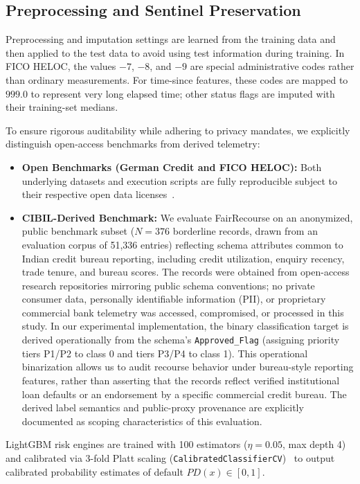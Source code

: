 \documentclass[manuscript,screen,review,anonymous]{acmart}
\begin{document}
\subsection{Preprocessing and Sentinel Preservation}
Preprocessing and imputation settings are learned from the training data and then applied to the test data to avoid using test information during training. In FICO HELOC, the values $-7$, $-8$, and $-9$ are special administrative codes rather than ordinary measurements. For time-since features, these codes are mapped to $999.0$ to represent very long elapsed time; other status flags are imputed with their training-set medians.

To ensure rigorous auditability while adhering to privacy mandates, we explicitly distinguish open-access benchmarks from derived telemetry:
\begin{itemize}
    \item \textbf{Open Benchmarks (German Credit and FICO HELOC):} Both underlying datasets and execution scripts are fully reproducible subject to their respective open data licenses~\cite{uci1994statlog,fico2018challenge}.
    \item \textbf{CIBIL-Derived Benchmark:} We evaluate FairRecourse on an anonymized, public benchmark subset ($N=376$ borderline records, drawn from an evaluation corpus of 51,336 entries) reflecting schema attributes common to Indian credit bureau reporting, including credit utilization, enquiry recency, trade tenure, and bureau scores. The records were obtained from open-access research repositories mirroring public schema conventions; no private consumer data, personally identifiable information (PII), or proprietary commercial bank telemetry was accessed, compromised, or processed in this study. In our experimental implementation, the binary classification target is derived operationally from the schema's \texttt{Approved\_Flag} (assigning priority tiers P1/P2 to class 0 and tiers P3/P4 to class 1). This operational binarization allows us to audit recourse behavior under bureau-style reporting features, rather than asserting that the records reflect verified institutional loan defaults or an endorsement by a specific commercial credit bureau. The derived label semantics and public-proxy provenance are explicitly documented as scoping characteristics of this evaluation.
\end{itemize}

LightGBM risk engines are trained with 100 estimators ($\eta=0.05$, max depth 4) and calibrated via 3-fold Platt scaling (\texttt{CalibratedClassifierCV})~\cite{platt1999probabilistic} to output calibrated probability estimates of default $PD(x) \in [0, 1]$.
\end{document}
